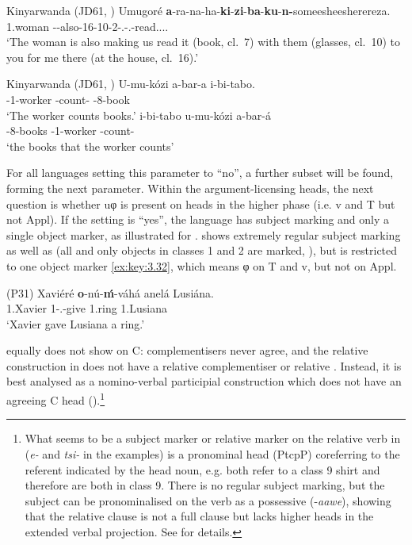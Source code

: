 \documentclass[output=paper]{langsci/langscibook}
\begin{document}
\ea\label{ex:key:3.30}Kinyarwanda (JD61, \citealt[183]{BeauNurRos2004}) \label{bkm:Ref317954425}
    \sn
    \gll Umugoré  \textbf{a}{}-ra-na-ha-\textbf{ki}{}-\textbf{zi}{}-\textbf{ba}{}-\textbf{ku}{}-\textbf{n-}someesheesherereza.\\
    1.woman \First\Sm{}{}-\Dj{}-also-16\Om{}-10\Om{}-2\Om-\Ssg.\Om-\Fsg.\Om-read.\Caus{}.\Caus{}.\Appl{}.\Appl{}\\
    \glt    ‘The woman is also making us read it (book, cl.\ 7) with them (glasses,
        cl.\ 10) to you for me there (at the house, cl.\ 16).’
\z

\ea\label{ex:key:3.31}Kinyarwanda (JD61, \citealt[11]{ZellerNgoboka2014}) \label{bkm:Ref345185298}
	\ea
	\gll	 U-mu-kózi  a-bar-a  i-bi-tabo.\\
	    \Aug{}{}-1-worker  \First\Sm{}{}-count-\Fv{}  \Aug{}{}-8-book\\
	\glt    ‘The worker counts books.’
	\ex
	\gll	 i-bi-tabo  u-mu-kózi  a-bar-á\\
	    \Aug{}{}-8-books  \Aug{}{}-1-worker  \First\Sm{}{}-count-\Fv{}\\
	\glt    ‘the books that the worker counts’
	\z
\z

For all languages setting this parameter to \enquote{no}, a further subset will be
found, forming the next parameter. Within the argument-licensing heads, the
next question is whether uφ is present on heads in the higher phase (i.e. v and
T but not Appl). If the setting is \enquote{yes}, the language has subject marking and
only a single object marker, as illustrated for .  shows
extremely regular subject marking as well as  (all and only
objects in classes 1 and 2 are marked, ), but is
restricted to one object marker \eqref{ex:key:3.32}, which means φ on T and v, but
not on Appl.

\ea\label{ex:key:3.32}  (P31) \label{bkm:Ref347928062}
    \sn
    \gll    Xaviéré  \textbf{o}{}-nú-\textbf{ḿ}{}-váhá  anelá  Lusiána.\\
            1.Xavier  1\Sm-\Pfv.\Om{}-give  1.ring  1.Lusiana\\
    \glt        ‘Xavier gave Lusiana a ring.’
\z

 equally does not show  on C: complementisers never agree, and
the relative construction in  does not have a relative complementiser or
relative . Instead, it is best analysed as a nomino-verbal participial
construction which does not have an agreeing C head
().\footnote{What seems to be a subject marker or
relative marker on the relative verb in  (\emph{e-} and \emph{tsi-} in
the examples) is a pronominal head (PtcpP) coreferring to the referent
indicated by the head noun, e.g. both refer to a class 9 shirt and therefore
are both in class 9. There is no regular subject marking, but the subject can
be pronominalised on the verb as a possessive (-\emph{aawe}), showing that the
relative clause is not a full clause but lacks higher heads in the extended
verbal projection. See \Textcite{vanderWal2010} for details.}
\end{document}
